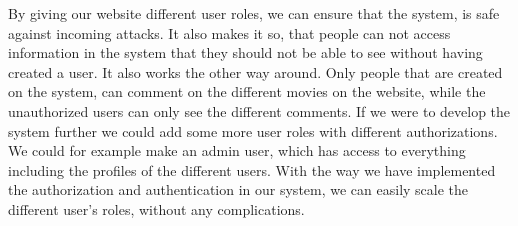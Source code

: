By giving our website different user roles, we can
ensure that the system, is safe against incoming
attacks. It also makes it so, that people can not access
information in the system that they should not be
able to see without having created a user.
It also works the other way around. Only people
that are created on the system, can comment on the
different movies on the website, while the unauthorized users can only see the different comments. If
we were to develop the system further we could add
some more user roles with different authorizations.
We could for example make an admin user, which has access
to everything including the profiles of the different
users. With the way we have implemented the
authorization and authentication in our system, we
can easily scale the different user's roles, without any
complications. \newline

